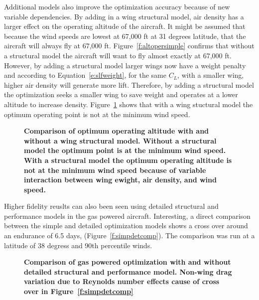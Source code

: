 \documentclass[]{aiaa-tc}%
\begin{document}
Additional models also improve the optimization accuracy because of new variable dependencies. 
By adding in a wing structural model, air density has a larger effect on the operating altitude of the aircraft.  
It might be assumed that because the wind speeds are lowest at 67,000 ft at 31 degrees latitude, that the aircraft will always fly at 67,000 ft.  
Figure~\ref{f:altopersimple} confirms that without a structural model the aircraft will want to fly almost exactly at 67,000 ft.  
However, by adding a structural model larger wings now have a weight penalty and according to Equation~\eqref{e:slfweight}, for the same $C_L$, with a smaller wing, higher air density will generate more lift. 
Therefore, by adding a structural model the optimization seeks a smaller wing to save weight and operates at a lower altitude to increase density. 
Figure~\ref{f:altoper} shows that with a wing stuctural model the optimum operating point is not at the minimum wind speed. 

\begin{figure}[H]
 \begin{subfigmatrix}{2}%
 \end{subfigmatrix}
 \caption{\textbf{Comparison of optimum operating altitude with and without a wing structural model.  Without a structural model the optimum point is at the minimum wind speed.  With a structural model the optimum operating altitude is not at the minimum wind speed because of variable interaction between wing ewight, air density, and wind speed. }}
 \label{f:altoper}
\end{figure}

Higher fidelity reuslts can also been seen using detailed structural and performance models in the gas powered aircraft. 
Interesting, a direct comparison between the simple and detailed optimization models shows a cross over around an endurance of 6.5 days, (Figure~\ref{f:simpdetcomp}). The comparison was run at a latitude of 38 degress and 90th percentile winds.

\begin{figure}[H]
 \begin{subfigmatrix}{2}%
 \end{subfigmatrix}
 \caption{\textbf{Comparison of gas powered optimization with and without detailed structural and performance model.  Non-wing drag variation due to Reynolds number effects cause of cross over in Figure~\ref{f:simpdetcomp}}}
 \label{f:gasdetcomp}
\end{figure}
\end{document}
